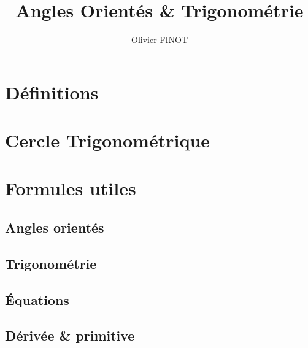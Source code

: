 \documentclass[12pt,a4paper]{article}
\author{Olivier FINOT}
\date{}
\title{Angles Orientés \& Trigonométrie }
\begin{document}
\maketitle



\section{Définitions}
%
	

%

\section{Cercle Trigonométrique}

\begin{center}

\end{center}
%
%
\section{Formules utiles}
%
\subsection*{Angles orientés}
%

%
%
\subsection*{Trigonométrie}
%




\subsection*{\'Equations}


\subsection*{Dérivée \& primitive}


%
%
%
%
%
%
%
%
\end{document}
